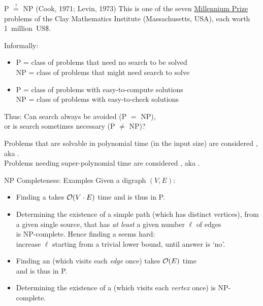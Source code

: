 \documentclass{cons-beamer}
\begin{document}
\begin{frame}{P $\overset{?}{=}$ NP \hfill (Cook, 1971; Levin, 1973)}
  This is one of the seven
  \href{https://www.claymath.org/millennium/p-vs-np}{Millennium Prize}
  problems of the Clay Mathematics Institute (Massachusetts, USA),
  each worth 1~million~US\$. \vfill
  
  Informally:
  \begin{itemize}
    \item P = class of problems that need \alert{no} search to be solved \\
      NP = class of problems that \alert{might} need search to solve 
    \item P = class of problems with easy-to-\alert{compute} solutions \\
      NP = class of problems with easy-to-\alert{check} solutions
  \end{itemize}
  Thus: Can search always be avoided (P $=$ NP), \\ or is search
  sometimes necessary (P $\neq$ NP)? \vfill

  Problems that are solvable in polynomial time (in the input size)
  are considered , aka . \\ Problems
  needing super-polynomial time are considered ,
  aka .
\end{frame}

\begin{frame}[label={longest}]{NP Completeness: Examples}
  Given a digraph $(V,E)$:
  \begin{examples}
    \begin{itemize}
    \item Finding a  takes 
      $\mathcal{O}(V \cdot E)$ time and is thus in P. 
    \item Determining the existence of a simple path (which has
      distinct vertices), from a given single source, that has
      \emph{at least} a given number $\ell$ of edges \\ is
      NP-complete.  Hence finding a 
      seems hard: \\ increase $\ell$ starting from a trivial lower
      bound, until answer is `no'.
    \end{itemize}
  \end{examples} 
  \begin{examples}
    \begin{itemize}
    \item Finding an  (which visits each
      \emph{edge} once) takes  $\mathcal{O}(E)$ time \\ and is thus in P. 
    \item Determining the existence of a 
      (which visits each \emph{vertex} once) is NP-complete.
    \end{itemize}
  \end{examples}
\end{frame}
\end{document}
